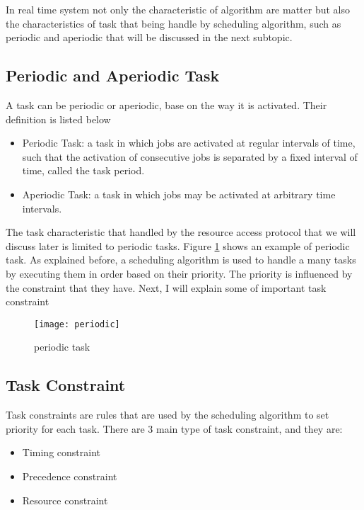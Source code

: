 In real time system not only the characteristic of algorithm are matter but also the characteristics  of task that being handle by scheduling algorithm, such as periodic and aperiodic that will be discussed in the next subtopic.

\subsection{Periodic and Aperiodic Task}

A task can be periodic or aperiodic, base on the way it is activated. Their definition is listed below \cite{b4}
\begin{itemize}
\item Periodic Task: a task in which jobs are activated at regular intervals of time, such that the activation of consecutive jobs is separated by a fixed interval of time, called the task period\cite{b4}.
\item Aperiodic Task: a task in which jobs may be activated at arbitrary time intervals\cite{b4}.
\end{itemize}

The task characteristic that handled by the resource access protocol that we will discuss later is limited to periodic tasks. Figure \ref{fig:periodic} shows an example of periodic task. As explained before, a scheduling algorithm is used to handle a many tasks by executing them in order based on their priority. The priority is influenced by the constraint that they have. Next,  I will explain some of important task constraint

\begin{figure}[h]
    \centering
    \texttt{[image: periodic]}
    \caption{periodic task \cite{b5}}
    \label{fig:periodic}
\end{figure}

\subsection{Task Constraint}

Task constraints are rules that are used by the scheduling algorithm to set  priority for each task. There are 3 main type of task constraint, and they are:

\begin{itemize}
\item Timing constraint
\item Precedence constraint
\item Resource constraint
\end{itemize}

